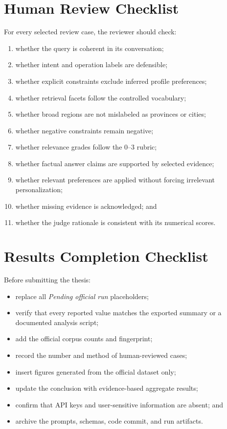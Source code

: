 \section{Human Review Checklist}

For every selected review case, the reviewer should check:

\begin{enumerate}
    \item whether the query is coherent in its conversation;
    \item whether intent and operation labels are defensible;
    \item whether explicit constraints exclude inferred profile preferences;
    \item whether retrieval facets follow the controlled vocabulary;
    \item whether broad regions are not mislabeled as provinces or cities;
    \item whether negative constraints remain negative;
    \item whether relevance grades follow the 0--3 rubric;
    \item whether factual answer claims are supported by selected evidence;
    \item whether relevant preferences are applied without forcing irrelevant
    personalization;
    \item whether missing evidence is acknowledged; and
    \item whether the judge rationale is consistent with its numerical scores.
\end{enumerate}

\section{Results Completion Checklist}

Before submitting the thesis:

\begin{itemize}
    \item replace all \textit{Pending official run} placeholders;
    \item verify that every reported value matches the exported summary or a
    documented analysis script;
    \item add the official corpus counts and fingerprint;
    \item record the number and method of human-reviewed cases;
    \item insert figures generated from the official dataset only;
    \item update the conclusion with evidence-based aggregate results;
    \item confirm that API keys and user-sensitive information are absent; and
    \item archive the prompts, schemas, code commit, and run artifacts.
\end{itemize}
